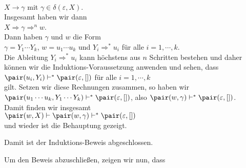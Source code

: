 \begin{enumerate}
\begin{enumerate}
                  \\[0.2cm]
                  \hspace*{1.3cm} $X \rightarrow \gamma$ \quad mit $\gamma \in \delta(\varepsilon,X)$.
                  \\[0.2cm]
                  Insgesamt haben wir dann
                  \\[0.2cm]
                  \hspace*{1.3cm} $X \Rightarrow \gamma \Rightarrow^n w$.
                  \\[0.2cm]
                  Dann haben $\gamma$ und $w$ die Form
                  \\[0.2cm]
                  \hspace*{1.3cm} $\gamma = Y_1 \cdots Y_k$, \quad $w = u_1 \cdots u_k$ \quad und
                  \quad $Y_i \Rightarrow^* u_i$ \quad f\"ur alle $i=1,\cdots,k$.
                  \\[0.2cm]
                  Die Ableitung $Y_i \Rightarrow^* u_i$ kann h\"ochstens aus $n$ Schritten bestehen
                  und daher k\"onnen wir die Induktions-Voraussetzung anwenden und sehen, dass
                  \\[0.2cm]
                  \hspace*{1.3cm} 
                  $\pair(u_i, Y_i) \vdash^* \pair(\varepsilon, [])$ \quad f\"ur alle $i=1,\cdots,k$
                  \\[0.2cm]
                  gilt. Setzen wir diese Rechnungen zusammen, so haben wir
                  \\[0.2cm]
                  \hspace*{1.3cm} 
                  $\pair(u_1 \cdots u_k, Y_1 \cdots Y_k) \vdash^* \pair(\varepsilon, [])$, \quad also 
                  \quad $\pair(w,\gamma) \vdash^* \pair(\varepsilon, [])$.
                  \\[0.2cm]
                  Damit finden wir insgesamt
                  \\[0.2cm]
                  \hspace*{1.3cm}
                  $\pair(w,X) \vdash \pair(w,\gamma) \vdash^* \pair(\varepsilon, [])$
                  \\[0.2cm]
                  und wieder ist die Behauptung gezeigt.
            \end{enumerate}
            Damit ist der Induktions-Beweis abgeschlossen.
\end{enumerate}
Um den Beweis abzuschlie{\ss}en, zeigen wir nun, dass
\\[0.2cm]
